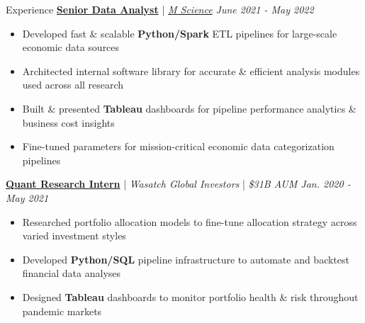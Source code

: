 \documentclass{resume/resume}
\begin{document}
\begin{rSection}{Experience}
  \href{https://mscience.com/}{\bf Senior Data Analyst} | {\em \href{https://mscience.com}{M Science} \hfill June 2021 - May 2022}
  \vspace{-6pt}
  \begin{itemize}[nosep]
    \item Developed fast \& scalable {\bf Python/Spark} ETL pipelines for large-scale economic data sources
    \item Architected internal software library for accurate \& efficient analysis modules used across all research
    \item Built \& presented {\bf Tableau} dashboards for pipeline performance analytics \& business cost insights
    \item Fine-tuned parameters for mission-critical economic data categorization pipelines
  \end{itemize}

  \href{https://wasatchglobal.com/}{\bf Quant Research Intern} | {\em Wasatch Global Investors} | {\em \$31B AUM \hfill Jan. 2020 - May 2021}
  \vspace{-6pt}
  \begin{itemize}[nosep]
    \item Researched portfolio allocation models to fine-tune allocation strategy across varied investment styles
    \item Developed {\bf Python/SQL} pipeline infrastructure to automate and backtest financial data analyses
    \item Designed {\bf Tableau} dashboards to monitor portfolio health \& risk throughout pandemic markets
  \end{itemize}


\end{rSection}
\end{document}
